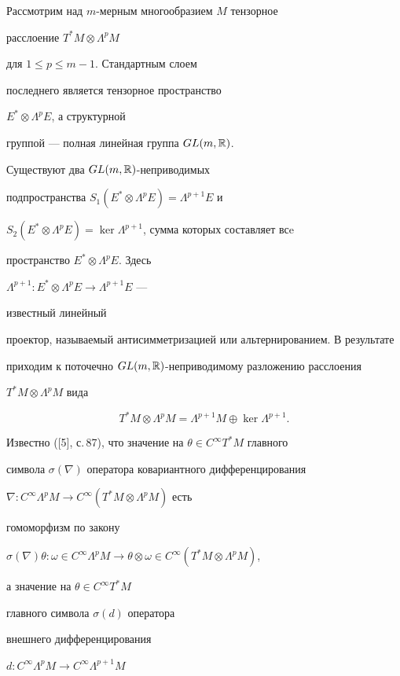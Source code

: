 \begin{pf}


Рассмотрим над $m$-мерным многообразием $M$ тензорное


расслоение $T^*M \otimes \Lambda^pM$ 


для $1 \le p \le m-1$. Стандартным слоем


последнего является тензорное пространство


$E^*\otimes \Lambda^pE$, а структурной


группой --- полная линейная группа $GL(m,\Bbb R)$.


Существуют два $GL(m,\Bbb R)$-неприводимых


подпространства $S_1(E^* \otimes \Lambda^p E)=\Lambda^{p+1}E$ и


$S_2(E^* \otimes \Lambda^pE)=\ker\Lambda^{p+1}$, сумма которых составляет всe


пространство $E^* \otimes \Lambda^p E$. Здесь


$\Lambda^{p+1}:E^*\otimes \Lambda^p E\to \Lambda^{p+1}E$ ---


известный линейный


проектор, называемый антисимметризацией или альтернированием. В результате


приходим к поточечно $GL(m,\Bbb R)$-неприводимому разложению расслоения


$T^*M \otimes \Lambda^p M$ вида


$$


T^*M \otimes \Lambda^pM=\Lambda^{p+1}M \oplus \ker\Lambda^{p+1}.


$$


Известно ([5], с.\,87), что значение на $\theta\in C^\infty T^*M$ главного


символа $\sigma(\nabla)$ оператора ковариантного дифференцирования


$\nabla:C^\infty\Lambda^pM\to C^\infty (T^*M \otimes \Lambda^p M)$ есть 


гомоморфизм по закону


$\sigma(\nabla)\theta :


\omega\in C^\infty\Lambda^p M \to \theta \otimes\omega


\in C^\infty(T^*M \otimes \Lambda^p M)$,


а значение на $\theta \in C^\infty T^*M$ 


главного символа $\sigma(d)$ оператора


внешнего дифференцирования


$d:C^\infty\Lambda^p M \to C^\infty \Lambda^{p+1} M$



\end{pf}
